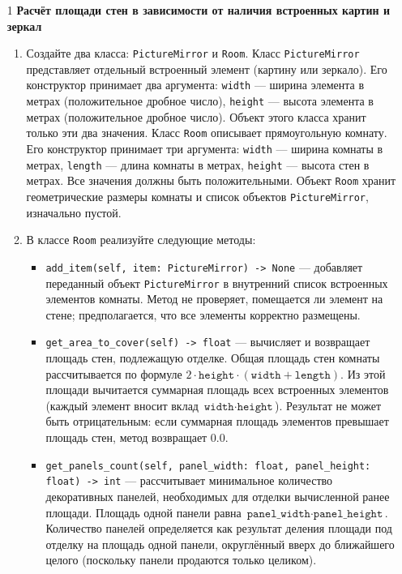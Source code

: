 \begin{enumerate}
\item[1] \textbf{Расчёт площади стен в зависимости от наличия встроенных картин и зеркал}
\begin{enumerate}
    \item Создайте два класса: \texttt{PictureMirror} и \texttt{Room}.  
    Класс \texttt{PictureMirror} представляет отдельный встроенный элемент (картину или зеркало). Его конструктор принимает два аргумента:  
    \texttt{width} — ширина элемента в метрах (положительное дробное число),  
    \texttt{height} — высота элемента в метрах (положительное дробное число).  
    Объект этого класса хранит только эти два значения.  
    Класс \texttt{Room} описывает прямоугольную комнату. Его конструктор принимает три аргумента:  
    \texttt{width} — ширина комнаты в метрах,  
    \texttt{length} — длина комнаты в метрах,  
    \texttt{height} — высота стен в метрах.  
    Все значения должны быть положительными. Объект \texttt{Room} хранит геометрические размеры комнаты и список объектов \texttt{PictureMirror}, изначально пустой.

    \item В классе \texttt{Room} реализуйте следующие методы:  
    \begin{itemize}
        \item \texttt{add\_item(self, item: PictureMirror) -> None} — добавляет переданный объект \texttt{PictureMirror} в внутренний список встроенных элементов комнаты. Метод не проверяет, помещается ли элемент на стене; предполагается, что все элементы корректно размещены.
        \item \texttt{get\_area\_to\_cover(self) -> float} — вычисляет и возвращает площадь стен, подлежащую отделке. Общая площадь стен комнаты рассчитывается по формуле \(2 \cdot \texttt{height} \cdot (\texttt{width} + \texttt{length})\). Из этой площади вычитается суммарная площадь всех встроенных элементов (каждый элемент вносит вклад \(\texttt{width} \cdot \texttt{height}\)). Результат не может быть отрицательным: если суммарная площадь элементов превышает площадь стен, метод возвращает 0.0.
        \item \texttt{get\_panels\_count(self, panel\_width: float, panel\_height: float) -> int} — рассчитывает минимальное количество декоративных панелей, необходимых для отделки вычисленной ранее площади. Площадь одной панели равна \(\texttt{panel\_width} \cdot \texttt{panel\_height}\). Количество панелей определяется как результат деления площади под отделку на площадь одной панели, округлённый вверх до ближайшего целого (поскольку панели продаются только целиком).
    \end{itemize}


\end{enumerate}
\end{enumerate}
